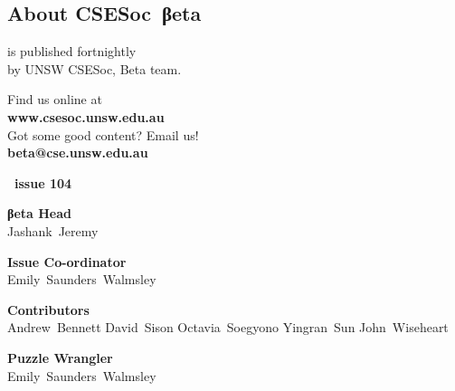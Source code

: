 \documentclass[twoside]{article}
\date{30 March 2015}
\makeatletter
\gdef\the@year{2015}
\gdef\the@issue{104}
\makeatother
\begin{document}
%
\newpage
\maketitle
\begingroup\begin{multicols}{2}
\section*{About CSE{}Soc~βeta}\begin{center}
\csesocbeta{} is published fortnightly\\
by UNSW CSESoc, Beta team.
\par Find us online at\\
\textbf{www.csesoc.unsw.edu.au}\\
Got some good content? Email us!\\
\textbf{beta@cse.unsw.edu.au}\\
\vspace{1em}\par
{\Large\bf\makeatletter \the@year\ issue \the@issue}
\par{\bf\sffamily βeta Head}\\ Jashank~Jeremy
\par{\bf\sffamily Issue Co-ordinator}\\ Emily~Saunders~Walmsley
\par{\bf\sffamily Contributors}\\
  Andrew~Bennett\hsp{}
  David~Sison\hsp{}
  Octavia~Soegyono\hsp{}
  Yingran~Sun\hsp{}
  John~Wiseheart\hsp{}
\par{\bf\sffamily Puzzle Wrangler}\\ Emily~Saunders~Walmsley
\end{center}

\columnbreak
\malcontents\thispagestyle{mag} \vfill\raggedcolumns
\end{multicols}
\endgroup

\begin{multicols}{2}

\end{multicols}
\end{document}
